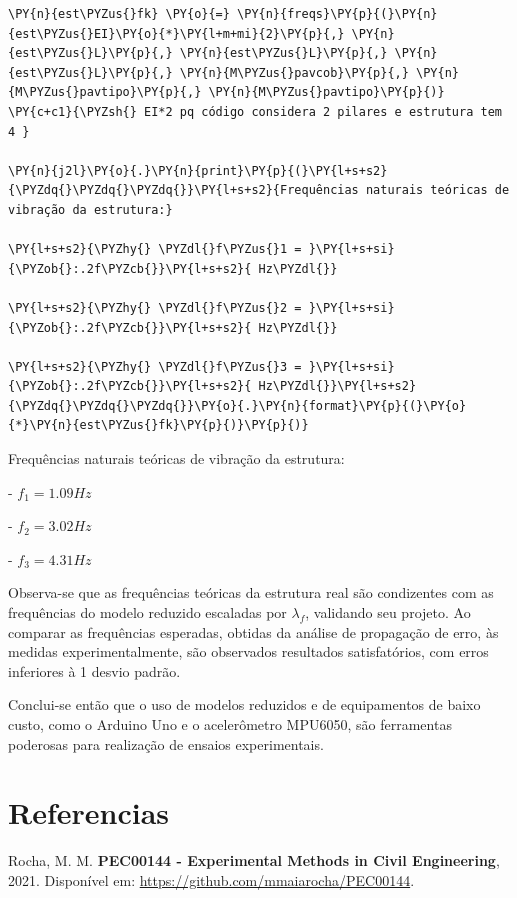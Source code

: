     \begin{tcolorbox}[breakable, size=fbox, boxrule=1pt, pad at break*=1mm,colback=cellbackground, colframe=cellborder]
\begin{Verbatim}[commandchars=\\\{\}]
\PY{n}{est\PYZus{}fk} \PY{o}{=} \PY{n}{freqs}\PY{p}{(}\PY{n}{est\PYZus{}EI}\PY{o}{*}\PY{l+m+mi}{2}\PY{p}{,} \PY{n}{est\PYZus{}L}\PY{p}{,} \PY{n}{est\PYZus{}L}\PY{p}{,} \PY{n}{est\PYZus{}L}\PY{p}{,} \PY{n}{M\PYZus{}pavcob}\PY{p}{,} \PY{n}{M\PYZus{}pavtipo}\PY{p}{,} \PY{n}{M\PYZus{}pavtipo}\PY{p}{)} 
\PY{c+c1}{\PYZsh{} EI*2 pq código considera 2 pilares e estrutura tem 4 }

\PY{n}{j2l}\PY{o}{.}\PY{n}{print}\PY{p}{(}\PY{l+s+s2}{\PYZdq{}\PYZdq{}\PYZdq{}}\PY{l+s+s2}{Frequências naturais teóricas de vibração da estrutura:}

\PY{l+s+s2}{\PYZhy{} \PYZdl{}f\PYZus{}1 = }\PY{l+s+si}{\PYZob{}:.2f\PYZcb{}}\PY{l+s+s2}{ Hz\PYZdl{}}

\PY{l+s+s2}{\PYZhy{} \PYZdl{}f\PYZus{}2 = }\PY{l+s+si}{\PYZob{}:.2f\PYZcb{}}\PY{l+s+s2}{ Hz\PYZdl{}}

\PY{l+s+s2}{\PYZhy{} \PYZdl{}f\PYZus{}3 = }\PY{l+s+si}{\PYZob{}:.2f\PYZcb{}}\PY{l+s+s2}{ Hz\PYZdl{}}\PY{l+s+s2}{\PYZdq{}\PYZdq{}\PYZdq{}}\PY{o}{.}\PY{n}{format}\PY{p}{(}\PY{o}{*}\PY{n}{est\PYZus{}fk}\PY{p}{)}\PY{p}{)}
\end{Verbatim}
\end{tcolorbox}

    Frequências naturais teóricas de vibração da estrutura:

- $f_1 = 1.09 Hz$

- $f_2 = 3.02 Hz$

- $f_3 = 4.31 Hz$

    
    Observa-se que as frequências teóricas da estrutura real são condizentes
com as frequências do modelo reduzido escaladas por \(\lambda_f\),
validando seu projeto. Ao comparar as frequências esperadas, obtidas da
análise de propagação de erro, às medidas experimentalmente, são
observados resultados satisfatórios, com erros inferiores à 1 desvio
padrão.

Conclui-se então que o uso de modelos reduzidos e de equipamentos de
baixo custo, como o Arduino Uno e o acelerômetro MPU6050, são
ferramentas poderosas para realização de ensaios experimentais.

    \hypertarget{referencias}{%
\section{Referencias}\label{referencias}}

Rocha, M. M. \textbf{PEC00144 - Experimental Methods in Civil
Engineering}, 2021. Disponível em:
\url{https://github.com/mmaiarocha/PEC00144}.


    
    
    

